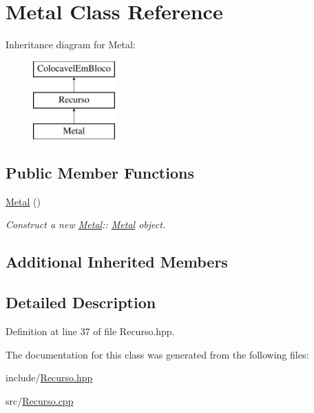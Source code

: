 \hypertarget{class_metal}{}\section{Metal Class Reference}
\label{class_metal}
Inheritance diagram for Metal\+:\begin{figure}[H]
\begin{center}
\leavevmode
\includegraphics[height=3.000000cm]{class_metal}
\end{center}
\end{figure}
\subsection*{Public Member Functions}
\begin{DoxyCompactItemize}
\item 
\mbox{\label{class_metal_a4439579b25694774c6e79daf71230524}} 
\mbox{\hyperlink{class_metal_a4439579b25694774c6e79daf71230524}{Metal}} ()
\begin{DoxyCompactList}\small\item\em Construct a new \mbox{\hyperlink{class_metal}{Metal}}\+:\+: \mbox{\hyperlink{class_metal}{Metal}} object. \end{DoxyCompactList}\end{DoxyCompactItemize}
\subsection*{Additional Inherited Members}


\subsection{Detailed Description}


Definition at line 37 of file Recurso.\+hpp.



The documentation for this class was generated from the following files\+:\begin{DoxyCompactItemize}
\item 
include/\mbox{\hyperlink{_recurso_8hpp}{Recurso.\+hpp}}\item 
src/\mbox{\hyperlink{_recurso_8cpp}{Recurso.\+cpp}}\end{DoxyCompactItemize}
